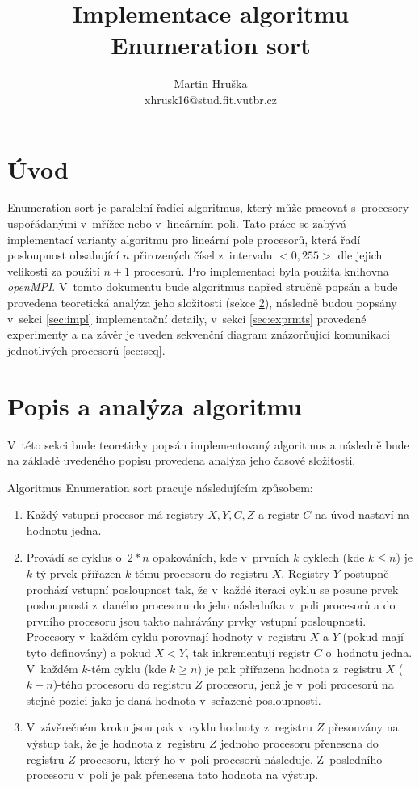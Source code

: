 \documentclass[a4paper, 12pt]{article}
\title{Implementace algoritmu Enumeration sort}
\author{Martin Hruška\\xhrusk16@stud.fit.vutbr.cz}
\date{}
\begin{document}
\maketitle

\section{Úvod}
\label{sec:intro}
Enumeration sort je paralelní řadící algoritmus, který může pracovat s~procesory uspořádanými v~mřížce nebo v~lineárním poli.
Tato práce se zabývá implementací varianty algoritmu pro lineární pole procesorů, která řadí
posloupnost obsahující $n$ přirozených čísel z~intervalu $<0,255>$ dle jejich velikosti za použití $n+1$ procesorů.
Pro implementaci byla použita knihovna \emph{openMPI}.
V~tomto dokumentu bude algoritmus napřed
stručně popsán a bude provedena teoretická analýza jeho složitosti (sekce \ref{sec:analysis}),
následně budou popsány v~sekci \ref{sec:impl} implementační detaily,
v~sekci \ref{sec:exprmts} provedené experimenty
a na závěr je uveden sekvenční diagram znázorňující komunikaci jednotlivých procesorů \ref{sec:seq}.

\section{Popis a analýza algoritmu}
\label{sec:analysis}
V~této sekci bude teoreticky popsán implementovaný algoritmus a následně bude na základě uvedeného popisu provedena
analýza jeho časové složitosti.

Algoritmus Enumeration sort pracuje následujícím způsobem:
\begin{enumerate}
\item Každý vstupní procesor má registry $X, Y, C, Z$ a registr $C$ na úvod nastaví
na hodnotu jedna.
\item Provádí se cyklus o~$2*n$ opakováních, kde v~prvních $k$ cyklech (kde $k\leq n$)
je $k$-tý prvek přiřazen $k$-tému procesoru do registru $X$.
Registry $Y$ postupně prochází vstupní posloupnost tak, že v~každé iteraci cyklu se posune prvek posloupnosti z~daného procesoru
do jeho následníka v~poli procesorů a do prvního procesoru jsou takto nahrávány prvky vstupní posloupnosti.
Procesory v~každém cyklu porovnají hodnoty v~registru $X$ a $Y$ (pokud mají tyto definovány)
a pokud $X < Y$, tak inkrementují registr $C$ o~hodnotu jedna.
V~každém $k$-tém cyklu (kde $k \geq n$) je pak přiřazena hodnota z~registru $X$ ($k-n$)-tého procesoru do registru $Z$ procesoru,
jenž je v~poli procesorů na stejné pozici jako je daná hodnota v~seřazené posloupnosti.
\item V~závěrečném kroku jsou pak v~cyklu hodnoty z~registru $Z$ přesouvány na výstup tak, že je hodnota
z~registru $Z$ jednoho procesoru přenesena do registru $Z$ procesoru, který ho v~poli procesorů následuje.
Z~posledního procesoru v~poli je pak přenesena tato hodnota na výstup.
\end{enumerate}
\end{document}
